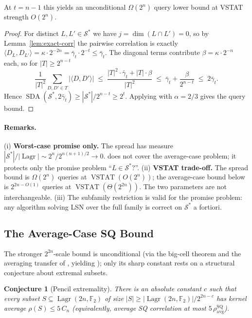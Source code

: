 \documentclass[11pt,a4paper]{article}
\theoremstyle{plain}
\newtheorem{conjecture}[theorem]{Conjecture}
\theoremstyle{definition}
\newcommand{\F}{\mathbb{F}}
\DeclareMathOperator{\Lagr}{Lagr}
\DeclareMathOperator{\SDA}{SDA}
\DeclareMathOperator{\VSTAT}{VSTAT}
\begin{document}
At $t = n-1$ this yields an unconditional $\Omega(2^n)$ query lower bound at VSTAT strength $O(2^n)$.

\begin{proof}
For distinct $L, L' \in \mathcal{S}^*$ we have $j = \dim(L \cap L') = 0$, so by Lemma~\ref{lem:exact-corr} the pairwise correlation is exactly $\langle D_L, D_{L'}\rangle = \kappa \cdot 2^{-2n} = \bar\gamma_t \cdot 2^{-t} \leq \bar\gamma_t$. The diagonal terms contribute $\beta = \kappa \cdot 2^{-n}$ each, so for $|T| \geq 2^{n-t}$
\[
\frac{1}{|T|^2}\sum_{D,D' \in T} |\langle D,D'\rangle|
\;\leq\; \frac{|T|^2 \cdot \bar\gamma_t + |T| \cdot \beta}{|T|^2}
\;\leq\; \bar\gamma_t + \frac{\beta}{2^{n-t}}
\;\leq\; 2\bar\gamma_t.
\]
Hence $\SDA(\mathcal{S}^*, 2\bar\gamma_t) \geq |\mathcal{S}^*| / 2^{n-t} \geq 2^t$. Applying  with $\alpha = 2/3$ gives the query bound.
\end{proof}

\paragraph{Remarks.}
(i) \textbf{Worst-case promise only.} The spread has measure $|\mathcal{S}^*|/|\Lagr| \sim 2^n / 2^{n(n+1)/2} \to 0$.  does not cover the average-case problem; it protects only the promise problem ``$L \in \mathcal{S}^*$?''.
(ii) \textbf{VSTAT trade-off.} The spread bound is $\Omega(2^n)$ queries at $\VSTAT(O(2^n))$; the average-case bound below is $2^{2n-O(1)}$ queries at $\VSTAT(\Theta(2^{2n}))$. The two parameters are not interchangeable.
(iii) The subfamily restriction is valid for the promise problem: any algorithm solving LSN over the full family is correct on $\mathcal{S}^*$ a fortiori.

\subsection{The Average-Case SQ Bound}
\label{subsec:main-sq}

The stronger $2^{2n}$-scale bound is unconditional (via the big-cell theorem and the averaging transfer of , yielding ); only its sharp constant rests on a structural conjecture about extremal subsets.

\begin{conjecture}[Pencil extremality]
\label{conj:pencil}
There is an absolute constant $c$ such that every subset $S \subseteq \Lagr(2n,\F_2)$ of size $|S| \geq |\Lagr(2n,\F_2)| / 2^{2n-c}$ has kernel average $\rho(S) \le 5\,C_n$ (equivalently, average SQ correlation at most $5\,\rho_{\mathrm{avg}}^{\mathrm{SQ}}$).
\end{conjecture}
\end{document}
